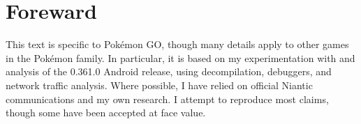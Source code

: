 \chapter{Foreward}

This text is specific to Pokémon GO, though many details
apply to other games in the Pokémon family.
In particular, it is based on my experimentation with and analysis of
 the 0.361.0 Android release, using decompilation, debuggers, and
 network traffic analysis.
Where possible, I have relied on official Niantic communications
 and my own research.
I attempt to reproduce most claims, though some have been accepted at face value.
